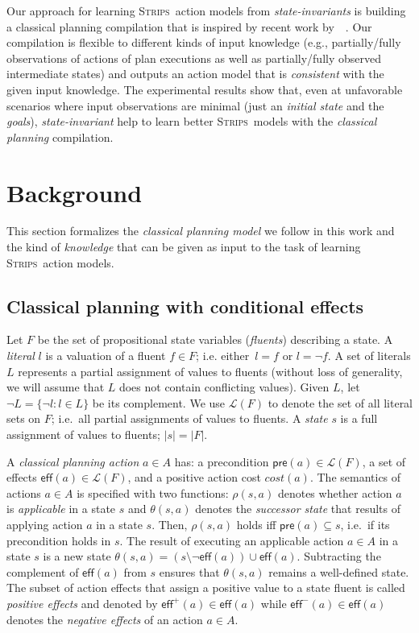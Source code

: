 \documentclass{article}
\newcommand{\pre}{\mathsf{pre}}     %
\newcommand{\eff}{\mathsf{eff}}     %
\newcommand{\strips}{\textsc{Strips}}
\begin{document}
Our approach for learning \strips\ action models from {\em state-invariants} is building a classical planning compilation that is inspired by recent work by~\citeauthor{aineto2018learning}~\citeyear{aineto2018learning}. Our compilation is flexible to different kinds of input knowledge (e.g., partially/fully observations of actions of plan executions as well as partially/fully observed intermediate states) and outputs an action model that is {\em consistent} with the given input knowledge. The experimental results show that, even at unfavorable scenarios where input observations are minimal (just an {\em initial state} and the {\em goals}), {\em state-invariant} help to learn better \strips\ models with the {\em classical planning} compilation. 



\section{Background}
\label{sec:background}
This section formalizes the {\em classical planning model} we follow in this work and the kind of {\em knowledge} that can be given as input to the task of learning \strips\ action models.  

\subsection{Classical planning with conditional effects}
Let $F$ be the set of  propositional state variables ({\em fluents}) describing a state. A {\em literal} $l$ is a valuation of a fluent $f\in F$; i.e. either~$l=f$ or $l=\neg f$. A set of literals $L$ represents a partial assignment of values to fluents (without loss of generality, we will assume that $L$ does not contain conflicting values). Given $L$, let $\neg L=\{\neg l:l\in L\}$ be its complement. We use $\mathcal{L}(F)$ to denote the set of all literal sets on $F$; i.e.~all partial assignments of values to fluents. A {\em state} $s$ is a full assignment of values to fluents; $|s|=|F|$.

A {\em classical planning action} $a\in A$ has: a precondition $\pre(a)\in\mathcal{L}(F)$, a set of effects $\eff(a)\in\mathcal{L}(F)$, and a positive action cost $cost(a)$. The semantics of actions $a\in A$ is specified with two functions: $\rho(s,a)$ denotes whether action $a$ is {\em applicable} in a state $s$ and $\theta(s,a)$ denotes the {\em successor state} that results of applying action $a$ in a state $s$. Then, $\rho(s,a)$ holds iff $\pre(a)\subseteq s$, i.e.~if its precondition holds in $s$. The result of executing an applicable action $a\in A$ in a state $s$ is a new state $\theta(s,a)=(s\setminus \neg\eff(a))\cup\eff(a)$. Subtracting the complement of $\eff(a)$ from $s$ ensures that $\theta(s,a)$ remains a well-defined state. The subset of action effects that assign a positive value to a state fluent is called {\em positive effects} and denoted by $\eff^+(a)\in \eff(a)$ while $\eff^-(a)\in \eff(a)$ denotes the {\em negative effects} of an action $a\in A$.
\end{document}
